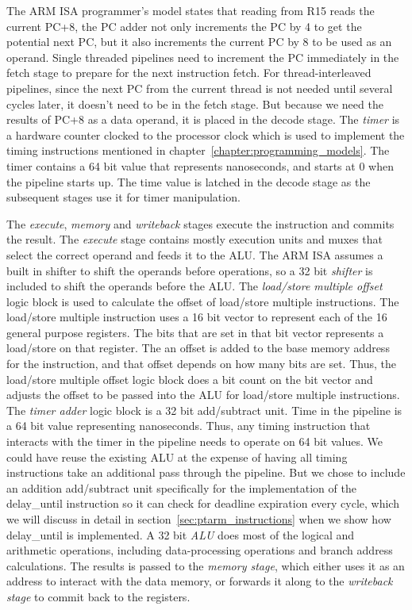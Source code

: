 The ARM ISA programmer's model states that reading from R15 reads the current PC+8, the PC adder not only increments the PC by 4 to get the potential next PC, but it also increments the current PC by 8 to be used as an operand. 
Single threaded pipelines need to increment the PC immediately in the fetch stage to prepare for the next instruction fetch.  
For thread-interleaved pipelines, since the next PC from the current thread is not needed until several cycles later, it doesn't need to be in the fetch stage. 
But because we need the results of PC+8 as a data operand, it is placed in the decode stage. 
The \emph{timer} is a hardware counter clocked to the processor clock which is used to implement the timing instructions mentioned in chapter~\ref{chapter:programming_models}.
The timer contains a 64 bit value that represents nanoseconds, and starts at 0 when the pipeline starts up.  
The time value is latched in the decode stage as the subsequent stages use it for timer manipulation.

The \emph{execute}, \emph{memory} and \emph{writeback} stages execute the instruction and commits the result. 
The \emph{execute} stage contains mostly execution units and muxes that select the correct operand and feeds it to the ALU.  
The ARM ISA assumes a built in shifter to shift the operands before operations, so a 32 bit \emph{shifter} is included to shift the operands before the ALU.   
The \emph{load/store multiple offset} logic block is used to calculate the offset of load/store multiple instructions.
The load/store multiple instruction uses a 16 bit vector to represent each of the 16 general purpose registers.
The bits that are set in that bit vector represents a load/store on that register.
The an offset is added to the base memory address for the instruction, and that offset depends on how many bits are set. 
Thus, the load/store multiple offset logic block does a bit count on the bit vector and adjusts the offset to be passed into the ALU for load/store multiple instructions.
The \emph{timer adder} logic block is a 32 bit add/subtract unit.
Time in the pipeline is a 64 bit value representing nanoseconds. 
Thus, any timing instruction that interacts with the timer in the pipeline needs to operate on 64 bit values.
We could have reuse the existing ALU at the expense of having all timing instructions take an additional pass through the pipeline.
But we chose to include an addition add/subtract unit specifically for the implementation of the delay\_until instruction so it can check for deadline expiration every cycle, which we will discuss in detail in section~\ref{sec:ptarm_instructions} when we show how delay\_until is implemented.    
A 32 bit \emph{ALU} does most of the logical and arithmetic operations, including data-processing operations and branch address calculations.
The results is passed to the \emph{memory stage}, which either uses it as an address to interact with the data memory, or forwards it along to the \emph{writeback stage} to commit back to the registers.

